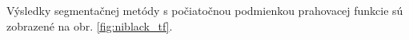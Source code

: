 \documentclass[a4paper,11pt,oneside]{article}%
\begin{document}
Výsledky segmentačnej metódy s počiatočnou podmienkou prahovacej funkcie sú zobrazené na obr. \ref{fig:niblack_tf}.

\begin{figure}[H]  
    \hspace{5px}

\end{figure}
\end{document}
